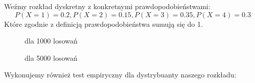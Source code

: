 \documentclass{article}
\begin{document}
\begin{enumerate}
		Weźmy rozkład dyskretny z konkretnymi prawdopodobieństwami:
		$$P(X = 1) = 0.2, P(X = 2) = 0.15, P(X = 3) = 0.35, P(X = 4) = 0.3$$
		Które zgodnie z definicją prawdopodobieństwa sumują się do 1.  
		\begin{figure}[h]
			\begin{center}
				\caption{dla 1000 losowań}
				\caption{dla 5000 losowań}
			\end{center}
		\end{figure}
	
		Wykonujemy również test empiryczny dla dystrybuanty naszego rozkładu:
		\begin{figure}[h]
			\begin{center}
\end{center}
\end{figure}
\end{enumerate}
\end{document}
